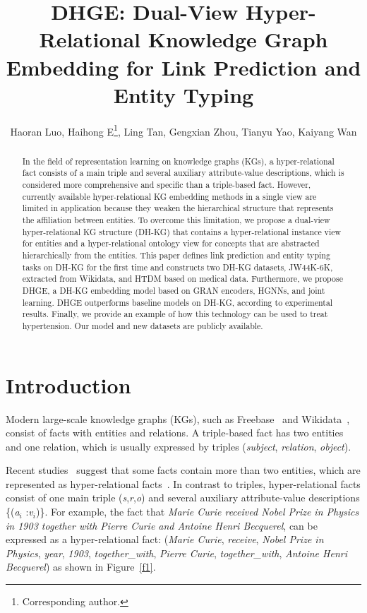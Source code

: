 \documentclass[letterpaper]{article} \usepackage{aaai23}  \usepackage{times}  \usepackage{helvet}  \usepackage{courier}  \usepackage[hyphens]{url}  \usepackage{graphicx} \urlstyle{rm} \def\UrlFont{\rm}  \usepackage{natbib}  \usepackage{caption} \frenchspacing  \setlength{\pdfpagewidth}{8.5in}  \setlength{\pdfpageheight}{11in}  \usepackage{times}
\title{DHGE: Dual-View Hyper-Relational Knowledge Graph Embedding for Link Prediction and Entity Typing}
\author{
Haoran Luo,
    Haihong E\thanks{Corresponding author.},
    Ling Tan,
    Gengxian Zhou,
    Tianyu Yao,
    Kaiyang Wan
}
\begin{document}
\maketitle

\begin{abstract}
In the field of representation learning on knowledge graphs (KGs), a hyper-relational fact consists of a main triple and several auxiliary attribute-value descriptions, which is considered more comprehensive and specific than a triple-based fact. However, currently available hyper-relational KG embedding methods in a single view are limited in application because they weaken the hierarchical structure that represents the affiliation between entities. To overcome this limitation, we propose a dual-view hyper-relational KG structure (DH-KG) that contains a hyper-relational instance view for entities and a hyper-relational ontology view for concepts that are abstracted hierarchically from the entities. This paper defines link prediction and entity typing tasks on DH-KG for the first time and constructs two DH-KG datasets, JW44K-6K, extracted from Wikidata, and HTDM based on medical data. Furthermore, we propose DHGE, a DH-KG embedding model based on GRAN encoders, HGNNs, and joint learning. DHGE outperforms baseline models on DH-KG, according to experimental results. Finally, we provide an example of how this technology can be used to treat hypertension. Our model and new datasets are publicly available.
\end{abstract}

\section{Introduction}
\label{s1}

Modern large-scale knowledge graphs (KGs), such as Freebase~\cite{Freebase} and Wikidata~\cite{Wikidata}, consist of facts with entities and relations. A triple-based fact has two entities and one relation, which is usually expressed by triples (\textit{subject}, \textit{relation}, \textit{object}). 


Recent studies~\citep{m-TransH, NaLP} suggest that some facts contain more than two entities, which are represented as hyper-relational facts~\citep{HINGE}. In contrast to triples, hyper-relational facts consist of one main triple (\textit{s},\textit{r},\textit{o}) and several auxiliary attribute-value descriptions \{(\textit{a$_i$ }:\textit{v$_i$})\}. For example, the fact that \textit{Marie Curie received Nobel Prize in Physics in 1903 together with Pierre Curie and Antoine Henri Becquerel}, can be expressed as a hyper-relational fact: (\textit{Marie Curie}, \textit{receive}, \textit{Nobel Prize in Physics}, \textit{year}, \textit{1903}, \textit{together\_with}, \textit{Pierre Curie}, \textit{together\_with}, \textit{Antoine Henri Becquerel}) as shown in Figure~\ref{f1}.
\end{document}
